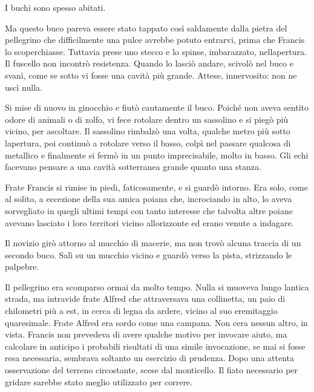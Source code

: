 I buchi sono spesso abitati.

Ma questo buco pareva essere stato tappato così saldamente dalla pietra
del pellegrino che difficilmente una pulce avrebbe potuto entrarvi,
prima che Francis lo scoperchiasse. Tuttavia prese uno stecco e lo
spinse, imbarazzato, nell\textquotesingle apertura. Il fuscello non
incontrò resistenza. Quando lo lasciò andare, scivolò nel buco e svanì,
come se sotto vi fosse una cavità più grande. Attese, innervosito: non
ne uscì nulla.

Si mise di nuovo in ginocchio e fiutò cautamente il buco. Poiché non
aveva sentito odore di animali o di zolfo, vi fece rotolare dentro un
sassolino e si piegò più vicino, per ascoltare. Il sassolino rimbalzò
una volta, qualche metro più sotto l\textquotesingle apertura, poi
continuò a rotolare verso il basso, colpì nel passare qualcosa di
metallico e finalmente si fermò in un punto imprecisabile, molto in
basso. Gli echi facevano pensare a una cavità sotterranea grande quanto
una stanza.

Frate Francis si rimise in piedi, faticosamente, e si guardò intorno.
Era solo, come al solito, a eccezione della sua amica poiana che,
incrociando in alto, lo aveva sorvegliato in quegli ultimi tempi con
tanto interesse che talvolta altre poiane avevano lasciato i loro
territori vicino all\textquotesingle orizzonte ed erano venute a
indagare.

Il novizio girò attorno al mucchio di macerie, ma non trovò alcuna
traccia di un secondo buco. Salì su un mucchio vicino e guardò verso la
pista, strizzando le palpebre.

Il pellegrino era scomparso ormai da molto tempo. Nulla si muoveva lungo
l\textquotesingle antica strada, ma intravide frate Alfred che
attraversava una collinetta, un paio di chilometri più a est, in cerca
di legna da ardere, vicino al suo eremitaggio quaresimale. Frate Alfred
era sordo come una campana. Non c\textquotesingle era nessun altro, in
vista. Francis non prevedeva di avere qualche motivo per invocare aiuto,
ma calcolare in anticipo i probabili risultati di una simile
invocazione, se mai si fosse resa necessaria, sembrava soltanto un
esercizio di prudenza. Dopo una attenta osservazione del terreno
circostante, scese dal monticello. Il fiato necessario per gridare
sarebbe stato meglio utilizzato per correre.

